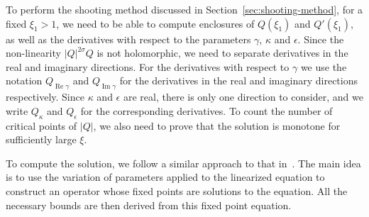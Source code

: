 \documentclass[11pt]{article}
\DeclareMathOperator{\real}{Re}
\DeclareMathOperator{\imag}{Im}
\begin{document}
To perform the shooting method discussed in
Section~\ref{sec:shooting-method}, for a fixed \(\xi_{1} > 1\), we
need to be able to compute enclosures of \(Q(\xi_{1})\) and
\(Q'(\xi_{1})\), as well as the derivatives with respect to the
parameters \(\gamma\), \(\kappa\) and \(\epsilon\). Since the
non-linearity \(|Q|^{2\sigma}Q\) is not holomorphic, we need to
separate derivatives in the real and imaginary directions. For the
derivatives with respect to \(\gamma\) we use the notation
\(Q_{\real\gamma}\) and \(Q_{\imag\gamma}\) for the derivatives in the
real and imaginary directions respectively. Since \(\kappa\) and
\(\epsilon\) are real, there is only one direction to consider, and we
write \(Q_{\kappa}\) and \(Q_{\epsilon}\) for the corresponding
derivatives. To count the number of critical points of \(|Q|\), we
also need to prove that the solution is monotone for sufficiently
large \(\xi\).

To compute the solution, we follow a similar approach to that
in~\cite{Plech2001}. The main idea is to use the variation of
parameters applied to the linearized equation to construct an operator
whose fixed points are solutions to the equation. All the necessary
bounds are then derived from this fixed point equation.
\end{document}
